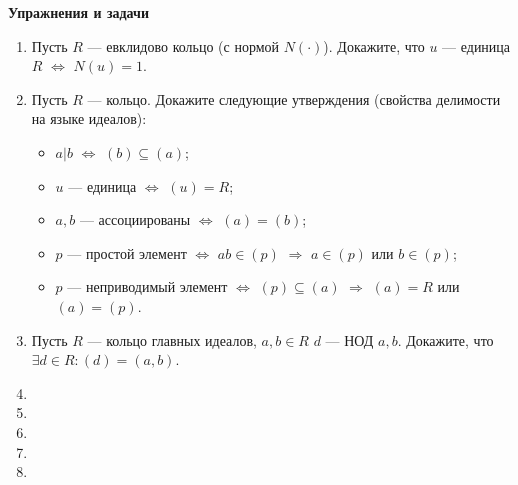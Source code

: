 
\noindent\textbf{Упражнения и задачи}
\begin{enumerate}[topsep=0pt]

    \item Пусть $R$ --- евклидово кольцо (с нормой $N(\cdot)$). Докажите, что $u$ --- единица $R$ $\Leftrightarrow$ $N(u)=1$.
    
    \item Пусть $R$ --- кольцо. Докажите следующие утверждения (свойства делимости на языке идеалов):
    \begin{itemize}[noitemsep,topsep=0pt]
        \item $a|b$ $\Leftrightarrow$ $(b) \subseteq (a)$;
        \item $u$ --- единица $\Leftrightarrow$ $(u)=R$;
        \item $a,b$ --- ассоциированы $\Leftrightarrow$ $(a)=(b)$;
        \item $p$ --- простой элемент $\Leftrightarrow$ $ab \in (p)$ $\Rightarrow$ $a \in (p)$ или $b \in (p)$;
        \item $p$ --- неприводимый элемент $\Leftrightarrow$ $(p) \subseteq (a)$ $\Rightarrow$ $(a) = R$ или $(a) = (p)$.
    \end{itemize}

    \item Пусть $R$ --- кольцо главных идеалов, $a,b \in R$ $d$ --- НОД $a,b$. Докажите, что $\exists d \in R: (d)=(a,b)$. 
    
    \item %
    \item %
    \item %
    \item %
    \item %
    
  
\end{enumerate}



